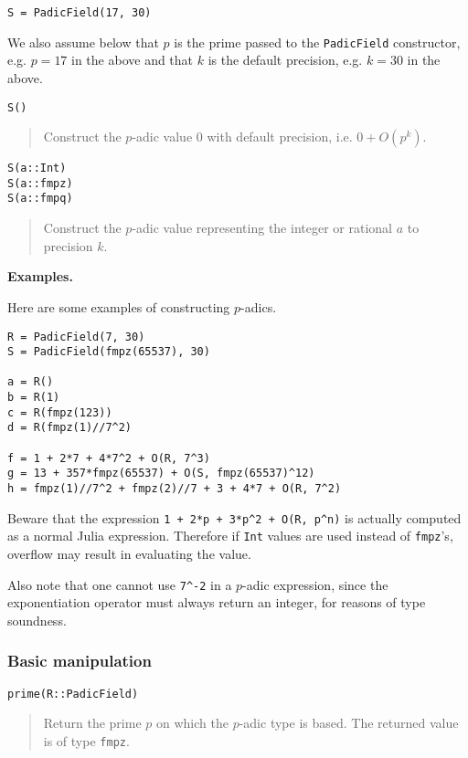 \documentclass[a4paper,10pt]{article}
\newcommand{\code}{\lstinline}
\newcommand{\desc}[1]{\vspace{-3mm}\begin{quote}#1\end{quote}}
\begin{document}
{{\begin{lstlisting}
S = PadicField(17, 30)
\end{lstlisting}

We also assume below that $p$ is the prime passed to the \code{PadicField}
constructor, e.g. $p = 17$ in the above and that $k$ is the default precision,
e.g. $k = 30$ in the above.

\begin{lstlisting}
S()
\end{lstlisting}

\desc{Construct the $p$-adic value $0$ with default precision, i.e. $0 + O(p^k)$.}

\begin{lstlisting}
S(a::Int)
S(a::fmpz)
S(a::fmpq)
\end{lstlisting}

\desc{Construct the $p$-adic value representing the integer or rational $a$ to
precision $k$.}

\textbf{Examples.}

Here are some examples of constructing $p$-adics.

\begin{lstlisting}
R = PadicField(7, 30)
S = PadicField(fmpz(65537), 30)

a = R()
b = R(1)
c = R(fmpz(123))
d = R(fmpz(1)//7^2)

f = 1 + 2*7 + 4*7^2 + O(R, 7^3)
g = 13 + 357*fmpz(65537) + O(S, fmpz(65537)^12)
h = fmpz(1)//7^2 + fmpz(2)//7 + 3 + 4*7 + O(R, 7^2)
\end{lstlisting}

Beware that the expression \code{1 + 2*p + 3*p^2 + O(R, p^n)} is actually computed as
a normal Julia expression. Therefore if \code{Int} values are used instead of
\code{fmpz}'s, overflow may result in evaluating the value.

Also note that one cannot use \code{7^-2} in a $p$-adic expression, since the 
exponentiation operator must always return an integer, for reasons of type soundness.

\subsubsection{Basic manipulation}

\begin{lstlisting}
prime(R::PadicField)
\end{lstlisting}

\desc{Return the prime $p$ on which the $p$-adic type is based. The returned
value is of type \code{fmpz}.}

}}
\end{document}
